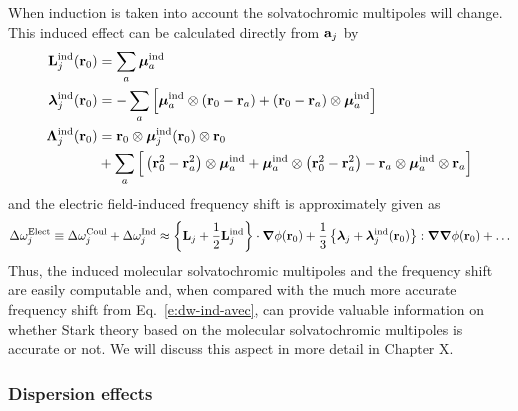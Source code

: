 \documentclass[a4paper,titlepage,twoside,fleqn,12pt]{book}
\newcommand{\BM}[1]{\bm{#1}}
\begin{document}
\begin{refsection}
When induction is taken into account the solvatochromic multipoles
will change. This induced effect can be calculated directly from
${\bf a}_j$ by
%
\begin{subequations}
\begin{align}
{\bf L}_j^{\rm ind}({\bf r}_0)       &=   \sum_a {\BM \mu}_a^{\rm ind} \\
{\BM \lambda}_j^{\rm ind}({\bf r}_0) &= - \sum_a \Big[ {\BM \mu}_a^{\rm ind} \otimes \left( {\bf r}_0 
                                       - {\bf r}_a \right) + \left( {\bf r}_0 
                                       - {\bf r}_a \right) \otimes {\BM \mu}_a^{\rm ind} \Big] \\
{\BM \Lambda}_j^{\rm ind}({\bf r}_0) &=   {\bf r}_0 \otimes {\BM \mu}_j^{\rm ind}({\bf r}_0) \otimes {\bf r}_0 \nonumber \\ 
                                    &  + \sum_a \Big[ \left( {\bf r}_0^2 - {\bf r}_a^2 \right) \otimes {\BM \mu}_a^{\rm ind} 
                                       + {\BM \mu}_a^{\rm ind} \otimes \left( {\bf r}_0^2 - {\bf r}_a^2 \right) 
                                       - {\bf r}_a \otimes {\BM \mu}_a^{\rm ind} \otimes {\bf r}_a \Big]
\end{align}
\end{subequations}
%
and the electric field\hyp{}induced frequency shift 
is approximately given as
%
\begin{equation} \label{e:dmtp-solmmm-ind}
 \Delta\omega_j^{\rm Elect} \equiv  \Delta\omega_j^{\rm Coul} +  \Delta\omega_j^{\rm Ind} \approx  
                       \left\{ {\bf L}_j + \frac{1}{2} {\bf L}_j^{\rm ind} \right\} 
                       \cdot {\BM \nabla} \phi({\bf r}_0)   + 
      \frac{1}{3} \left\{ {\BM \lambda}_j + {\BM \lambda}_j^{\rm ind}({\bf r}_0) \right\} 
                           : {\BM \nabla}  {\BM \nabla} \phi({\bf r}_0)   +   \ldots
\end{equation}
%
Thus, the induced molecular solvatochromic multipoles and the frequency shift
are easily computable and, when compared with the much more accurate
frequency shift from Eq.~\eqref{e:dw-ind-avec}, can provide valuable 
information on whether Stark theory based on the molecular
solvatochromic multipoles is accurate or not. We will discuss 
this aspect in more detail in Chapter X.

\subsubsection{Dispersion effects\label{s:disp}}


\end{refsection}
\end{document}
